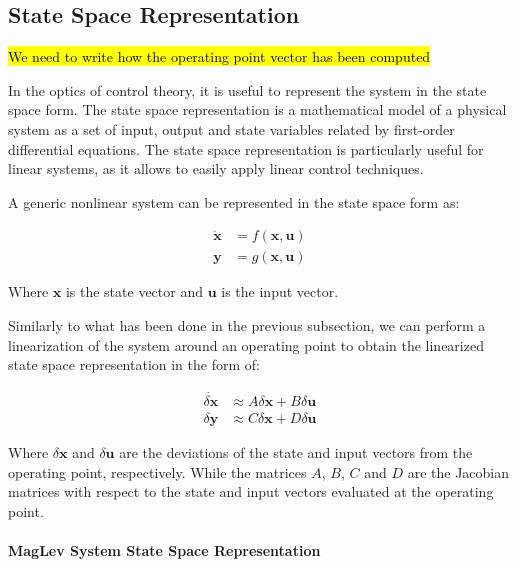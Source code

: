 \subsection{State Space Representation}
\label{subsec:state_space_representation}

\hl{We need to write how the operating point vector has been computed}

In the optics of control theory, it is useful to represent the system in the state space form.
The state space representation is a mathematical model of a physical system as a set of input, output and state variables related by first-order differential equations.
The state space representation is particularly useful for linear systems, as it allows to easily apply linear control techniques.

A generic nonlinear system can be represented in the state space form as:

\begin{equation}
    \begin{aligned}
        \dot{\mathbf{x}} & = f(\mathbf{x}, \mathbf{u}) \\
        \mathbf{y}       & = g(\mathbf{x}, \mathbf{u})
    \end{aligned}
\end{equation}

Where $\mathbf{x}$ is the state vector and $\mathbf{u}$ is the input vector.

Similarly to what has been done in the previous subsection, we can perform a linearization of the system around an operating point to obtain the linearized state space representation in the form of:

\begin{equation}
    \begin{aligned}
        \dot{\delta\mathbf{x}} & \approx A \delta\mathbf{x} + B \delta\mathbf{u} \\
        \delta\mathbf{y}       & \approx C \delta\mathbf{x} + D \delta\mathbf{u}
    \end{aligned}
\end{equation}

Where $\delta\mathbf{x}$ and $\delta\mathbf{u}$ are the deviations of the state and input vectors from the operating point, respectively.
While the matrices $A$, $B$, $C$ and $D$ are the Jacobian matrices with respect to the state and input vectors evaluated at the operating point.

\paragraph{MagLev System State Space Representation}

